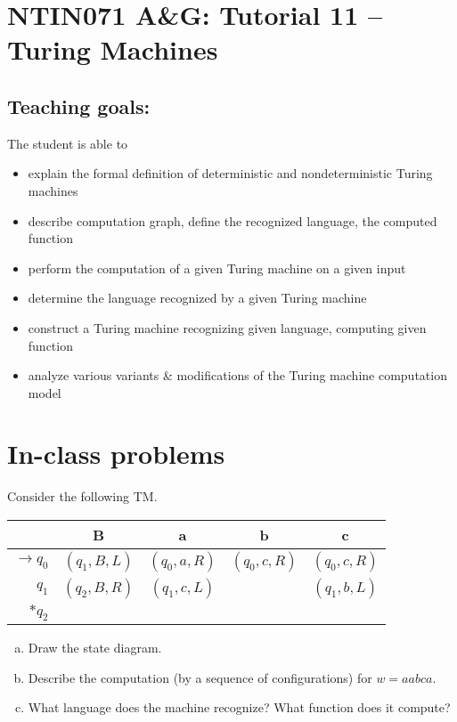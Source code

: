 \documentclass[a4paper,12pt]{amsart}
\begin{document}
\thispagestyle{empty}

\section*{NTIN071 A\&G: Tutorial 11 -- Turing Machines}

\medskip

\subsection*{Teaching goals:} The student is able to

\begin{itemize}\setlength{\itemsep}{0pt}
    \item explain the formal definition of deterministic and nondeterministic Turing machines
    \item describe computation graph, define the recognized language, the computed function
    \item perform the computation of a given Turing machine on a given input
    \item determine the language recognized by a given Turing machine
    \item construct a Turing machine recognizing given language, computing given function
    \item analyze various variants \& modifications of the Turing machine computation model
\end{itemize}



\section*{In-class problems}


\begin{problem}
    
    Consider the following TM.
    \vspace{-9pt}
    \begin{table}[h]
        \begin{tabular}{r|cccc}
        & B   & a    & b    &  c  \\ \hline
        $\to q_0$ & $(q_1, B, L)$ & $(q_0, a, R)$ & $(q_0, c, R)$ & $(q_0, c, R)$ \\
        $q_1$ & $(q_2, B, R)$ & $(q_1, c, L)$ &  & $(q_1, b, L)$ \\
        $\ast q_2$  &              &              &              &             
        \end{tabular}
    \end{table}

    \begin{enumerate}[(a)]
        \item Draw the state diagram.
        \item Describe the computation (by a sequence of configurations) for $w=aabca$.
        \item What language does the machine recognize? What function does it compute?
    \end{enumerate} 
    
\end{problem}
\end{document}
